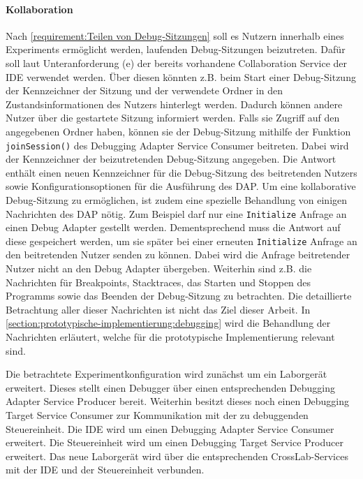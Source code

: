 \paragraph{Kollaboration} Nach \autoref{requirement:Teilen von Debug-Sitzungen} soll es Nutzern innerhalb eines Experiments ermöglicht werden, laufenden Debug-Sitzungen beizutreten. Dafür soll laut Unteranforderung (e) der bereits vorhandene Collaboration Service der IDE verwendet werden. Über diesen könnten z.B. beim Start einer Debug-Sitzung der Kennzeichner der Sitzung und der verwendete Ordner in den Zustandsinformationen des Nutzers hinterlegt werden. Dadurch können andere Nutzer über die gestartete Sitzung informiert werden. Falls sie Zugriff auf den angegebenen Ordner haben, können sie der Debug-Sitzung mithilfe der Funktion \texttt{joinSession()} des Debugging Adapter Service Consumer beitreten. Dabei wird der Kennzeichner der beizutretenden Debug-Sitzung angegeben. Die Antwort enthält einen neuen Kennzeichner für die Debug-Sitzung des beitretenden Nutzers sowie Konfigurationsoptionen für die Ausführung des \ac{DAP}. Um eine kollaborative Debug-Sitzung zu ermöglichen, ist zudem eine spezielle Behandlung von einigen Nachrichten des \ac{DAP} nötig. Zum Beispiel darf nur eine \texttt{Initialize} Anfrage an einen Debug Adapter gestellt werden. Dementsprechend muss die Antwort auf diese gespeichert werden, um sie später bei einer erneuten \texttt{Initialize} Anfrage an den beitretenden Nutzer senden zu können. Dabei wird die Anfrage beitretender Nutzer nicht an den Debug Adapter übergeben. Weiterhin sind z.B. die Nachrichten für Breakpoints, Stacktraces, das Starten und Stoppen des Programms sowie das Beenden der Debug-Sitzung zu betrachten. Die detaillierte Betrachtung aller dieser Nachrichten ist nicht das Ziel dieser Arbeit. In \autoref{section:prototypische-implementierung:debugging} wird die Behandlung der Nachrichten erläutert, welche für die prototypische Implementierung relevant sind.

Die betrachtete Experimentkonfiguration wird zunächst um ein Laborgerät erweitert. Dieses stellt einen Debugger über einen entsprechenden Debugging Adapter Service Producer bereit. Weiterhin besitzt dieses noch einen Debugging Target Service Consumer zur Kommunikation mit der zu debuggenden Steuereinheit. Die IDE wird um einen Debugging Adapter Service Consumer erweitert. Die Steuereinheit wird um einen Debugging Target Service Producer erweitert. Das neue Laborgerät wird über die entsprechenden CrossLab-Services mit der IDE und der Steuereinheit verbunden.